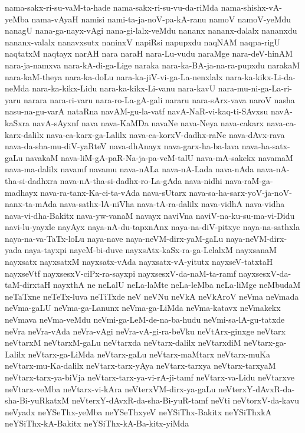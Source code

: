 {nama-sakx-ri-su-vaM-ta-hade
nama-sakx-ri-su-vu-da-riMda
nama-shishx-vA-yeMba
nama-vAyaH
namisi
nami-ta-ja-noV-pa-kA-ranu
namoV
namoV-yeMdu
nanagU
nana-ga-nayx-vAgi
nana-gi-lalx-veMdu
nananx
nananx-dalalx
nananxdu
nananx-valalx
nanavxsutx
naninxV
napiRsi
napupxdu
naqNAM
naqpa-rigU
naqtatxM
naqtayx
narAH
nara
naraH
nara-Lu-vudu
naraMge
nara-deV-hinAM
nara-ja-namxva
nara-kA-di-ga-Lige
naraka
nara-ka-BA-ja-na-ra-pupxdu
narakaM
nara-kaM-theya
nara-ka-doLu
nara-ka-jiV-vi-ga-La-nenxlalx
nara-ka-kikx-Li-da-neMda
nara-ka-kikx-Lidu
nara-ka-kikx-Li-vanu
nara-kavU
nara-mu-ni-ga-La-ri-yaru
narara
nara-ri-varu
nara-ro-La-gA-gali
nararu
nara-sArx-vava
naroV
nasha
nasu-na-gu-varA
nataRna
navAM-gu-la-vatf
navA-NaR-vi-kaq-ti-SAvxsu
navA-kaSxra
navA-sAyxnf
nava
nava-KaMDa
navaNe
nava-Neya
nava-cakarx
nava-ca-karx-dalilx
nava-ca-karx-ga-Lalilx
nava-ca-korxV-dadhx-raNe
nava-dAvx-rava
nava-da-sha-mu-diV-yaRteV
nava-dhAnayx
nava-garx-ha-ba-lava
nava-ha-satx-gaLu
navakaM
nava-liM-gA-paR-Na-ja-pa-veM-talU
nava-mA-sakekx
navamaM
nava-ma-dalilx
navamf
navamu
nava-nALa
nava-nA-Lada
nava-nAda
nava-nA-tha-si-dadhxra
nava-nA-tha-si-dadhx-ro-La-gAda
nava-nidhi
nava-raM-ga-madhayx
nava-ra-tanx-Ka-ci-ta-vAda
nava-sUtarx
nava-sa-ha-sarx-yoV-ja-noV-nanx-ta-mAda
nava-sathx-lA-niVha
nava-tA-ra-dalilx
nava-vidhA
nava-vidha
nava-vi-dha-Bakitx
nava-yw-vanaM
navayx
naviVna
naviV-na-ku-su-ma-vi-Didu
navi-lu-yayxle
nayAyx
naya-nA-du-tapxnAnx
naya-na-diV-pitxye
naya-na-sathxla
naya-na-va-TaTx-loLu
naya-nave
naya-neVM-dirx-yaM-gaLu
naya-neVM-dirx-yada
naya-tayxpi
nayeM-bi-duve
nayxsAtx-kaSx-ra-ga-LelalxM
nayxsanaM
nayxsatx
nayxsatxM
nayxsatx-vAda
nayxsatx-vA-yitutx
nayxseV-tatxtaH
nayxseVtf
nayxsesxV-ciPx-ra-sayxpi
nayxsesxV-da-naM-ta-ramf
nayxsesxV-da-taM-dirxtaH
nayxthA
ne
neLalU
neLa-laMte
neLa-leMba
neLa-liMge
neMbudaM
neTaTxne
neTeTx-luva
neTiTxde
neV
neVNu
neVkA
neVkAroV
neVma
neVmada
neVma-gaLU
neVma-ga-Lanunx
neVma-ga-LiMda
neVma-katavx
neVmakekx
neVmava
neVma-veMdu
neVmi-ga-LeM-de-na-ba-hudu
neVmi-sa-lA-gu-tatxde
neVra
neVra-vAda
neVra-vAgi
neVra-vA-gi-ra-beVku
neVtArx-ginxge
neVtarx
neVtarxM
neVtarxM-gaLu
neVtarxda
neVtarx-dalilx
neVtarxdiM
neVtarx-ga-Lalilx
neVtarx-ga-LiMda
neVtarx-gaLu
neVtarx-maMtarx
neVtarx-muKa
neVtarx-mu-Ka-dalilx
neVtarx-tarx-yAya
neVtarx-tarxya
neVtarx-tarxyaM
neVtarx-tarx-ya-biVja
neVtarx-tarx-ya-vi-rA-ji-tamf
neVtarx-va-Lidu
neVtarxve
neVtarx-veMba
neVtarx-vi-kAra
neVterxVM-dirx-ya-gaLu
neVterxY-dAvxR-da-sha-Bi-yuRkatxM
neVterxY-dAvxR-da-sha-Bi-yuR-tamf
neVti
neVtorxV-da-kavu
neVyadx
neYSeThx-yeMba
neYSeThxyeV
neYSiThx-Bakitx
neYSiThxkA
neYSiThx-kA-Bakitx
neYSiThx-kA-Ba-kitx-yiMda
}
